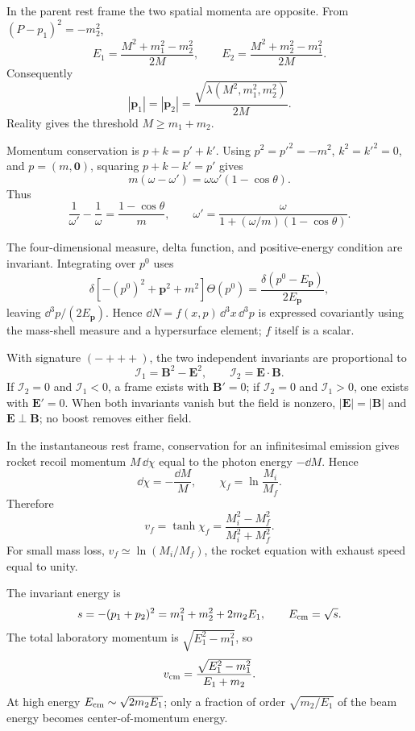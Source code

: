 \begin{solution}
In the parent rest frame the two spatial momenta are opposite.  From
\((P-p_1)^2=-m_2^2\),
\[
E_1=\frac{M^2+m_1^2-m_2^2}{2M},\qquad
E_2=\frac{M^2+m_2^2-m_1^2}{2M}.
\]
Consequently
\[
|\bm p_1|=|\bm p_2|
=\frac{\sqrt{\lambda(M^2,m_1^2,m_2^2)}}{2M}.
\]
Reality gives the threshold \(M\geq m_1+m_2\).
\end{solution}

\begin{solution}
Momentum conservation is \(p+k=p'+k'\).  Using
\(p^2=p'^2=-m^2\), \(k^2=k'^2=0\), and \(p=(m,\bm0)\), squaring
\(p+k-k'=p'\) gives
\[
m(\omega-\omega')=\omega\omega'(1-\cos\theta).
\]
Thus
\[
\frac1{\omega'}-\frac1\omega=\frac{1-\cos\theta}{m},
\qquad
\omega'=\frac{\omega}{1+(\omega/m)(1-\cos\theta)}.
\]
\end{solution}

\begin{solution}
The four-dimensional measure, delta function, and positive-energy condition
are invariant.  Integrating over \(p^0\) uses
\[
\delta[-(p^0)^2+\bm p^2+m^2]\Theta(p^0)
=\frac{\delta(p^0-E_{\bm p})}{2E_{\bm p}},
\]
leaving \(\dd^3p/(2E_{\bm p})\).  Hence
\(\dd N=f(x,p)\,\dd^3x\,\dd^3p\) is expressed covariantly using the
mass-shell measure and a hypersurface element; \(f\) itself is a scalar.
\end{solution}

\begin{solution}
With signature \((-+++)\), the two independent invariants are proportional to
\[
\mathcal I_1=\bm B^2-\bm E^2,\qquad
\mathcal I_2=\bm E\cdot\bm B.
\]
If \(\mathcal I_2=0\) and \(\mathcal I_1<0\), a frame exists with
\(\bm B'=0\); if \(\mathcal I_2=0\) and \(\mathcal I_1>0\), one exists with
\(\bm E'=0\).  When both invariants vanish but the field is nonzero,
\(|\bm E|=|\bm B|\) and \(\bm E\perp\bm B\); no boost removes either field.
\end{solution}

\begin{solution}
In the instantaneous rest frame, conservation for an infinitesimal emission
gives rocket recoil momentum \(M\,\dd\chi\) equal to the photon energy
\(-\dd M\).  Hence
\[
\dd\chi=-\frac{\dd M}{M},\qquad
\chi_f=\ln\frac{M_i}{M_f}.
\]
Therefore
\[
v_f=\tanh\chi_f
=\frac{M_i^2-M_f^2}{M_i^2+M_f^2}.
\]
For small mass loss, \(v_f\simeq\ln(M_i/M_f)\), the rocket equation with
exhaust speed equal to unity.
\end{solution}

\begin{solution}
The invariant energy is
\[
s=-(p_1+p_2)^2=m_1^2+m_2^2+2m_2E_1,
\qquad E_{\rm cm}=\sqrt{s}.
\]
The total laboratory momentum is
\(\sqrt{E_1^2-m_1^2}\), so
\[
v_{\rm cm}=\frac{\sqrt{E_1^2-m_1^2}}{E_1+m_2}.
\]
At high energy \(E_{\rm cm}\sim\sqrt{2m_2E_1}\); only a fraction of order
\(\sqrt{m_2/E_1}\) of the beam energy becomes center-of-momentum energy.
\end{solution}

